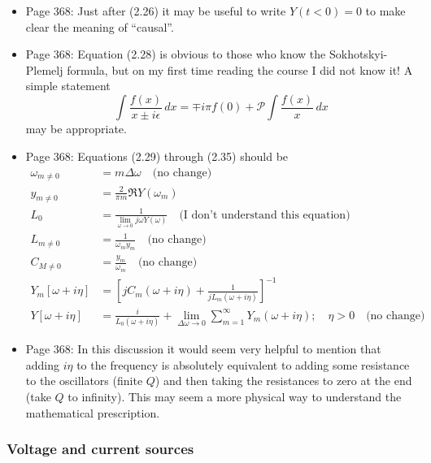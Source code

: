 \begin{itemize}

\item Page 368: Just after (2.26) it may be useful to write $Y(t<0)=0$ to make clear the meaning of ``causal''.

\item Page 368: Equation (2.28) is obvious to those who know the Sokhotskyi-Plemelj formula, but on my first time reading the course I did not know it! A simple statement
\begin{equation}
\int \frac{f(x)}{x \pm i \epsilon} \, dx =
\mp i \pi f(0) + \mathcal{P} \int \frac{f(x)}{x}\, dx
\end{equation}
may be appropriate.

\item Page 368: Equations (2.29) through (2.35) should be
\begin{align*}
\omega_{m \neq 0} &= m \Delta \omega \quad \text{(no change)} \\
y_{m \neq 0} &= \frac{2}{\pi m} \Re Y(\omega_m) \\
L_0 &= \frac{1}{\lim_{\omega \rightarrow 0} j \omega Y(\omega)} \quad \text{(I don't understand this equation)} \\
L_{m \neq 0} &= \frac{1}{\omega_m y_m} \quad \text{(no change)} \\
C_{M \neq 0} &= \frac{y_m}{\omega_m} \quad \text{(no change)} \\
Y_m [\omega + i \eta] &= \left[ j C_m(\omega + i \eta) + \frac{1}{j L_m (\omega + i \eta)} \right] ^{-1} \\
Y[\omega + i \eta] &= \frac{i}{L_0(\omega + i \eta)} + \lim_{\Delta \omega \rightarrow 0}
\sum_{m=1}^\infty Y_m(\omega + i \eta); \quad \eta > 0 \quad \text{(no change)}
\end{align*}

\item Page 368: In this discussion it would seem very helpful to mention that adding $i \eta$ to the frequency is absolutely equivalent to adding some resistance to the oscillators (finite $Q$) and then taking the resistances to zero at the end (take $Q$ to infinity). This may seem a more physical way to understand the mathematical prescription.

\end{itemize}

\subsubsection{Voltage and current sources}

